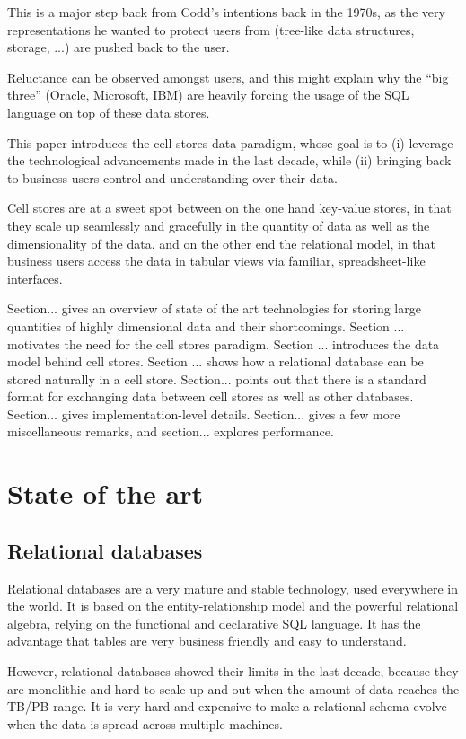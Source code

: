 \documentclass{vldb}
\begin{document}
This is a major step back from Codd's intentions back in the 1970s, as the very representations he wanted to protect users from (tree-like data structures, storage, ...) are pushed back to the user.

Reluctance can be observed amongst users, and this might explain why the ``big three'' (Oracle, Microsoft, IBM) are heavily forcing the usage of the SQL language on top of these data stores.

This paper introduces the cell stores data paradigm, whose goal is to (i) leverage the technological advancements made in the last decade, while (ii) bringing back to business users control and understanding over their data.

Cell stores are at a sweet spot between on the one hand key-value stores, in that they scale up seamlessly and gracefully in the quantity of data as well as the dimensionality of the data, and on the other end the relational model, in that business users access the data in tabular views via familiar, spreadsheet-like interfaces.

Section... gives an overview of state of the art technologies for storing large quantities of highly dimensional data and their shortcomings. Section ... motivates the need for the cell stores paradigm. Section ... introduces the data model behind cell stores. Section ... shows how a relational database can be stored naturally in a cell store. Section... points out that there is a standard format for exchanging data between cell stores as well as other databases. Section... gives implementation-level details. Section... gives a few more miscellaneous remarks, and section... explores performance.

\section{State of the art}

\subsection{Relational databases}

Relational databases are a very mature and stable technology, used everywhere in the world. It is based on the entity-relationship model and the powerful relational algebra, relying on the functional and declarative SQL language. It has the advantage that tables are very business friendly and easy to understand.

However, relational databases showed their limits in the last decade, because they are monolithic and hard to scale up and out when the amount of data reaches the TB/PB range. It is very hard and expensive to make a relational schema evolve when the data is spread across multiple machines.
\end{document}
